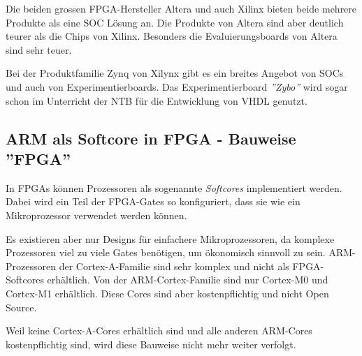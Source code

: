 Die beiden grossen FPGA-Hersteller Altera und auch Xilinx bieten beide mehrere Produkte als eine SOC Lösung an.
Die Produkte von Altera sind aber deutlich teurer als die Chips von Xilinx.
Besonders die Evaluierungsboards von Altera sind sehr teuer.

Bei der Produktfamilie Zynq von Xilynx gibt es ein breites Angebot von SOCs und auch von Experimentierboards.
Das Experimentierboard \textit{''Zybo''} wird sogar schon im Unterricht der NTB für die Entwicklung von VHDL genutzt.



\subsection{ARM als Softcore in FPGA - Bauweise ''FPGA''}
In FPGAs können Prozessoren als sogenannte \textit{Softcores} implementiert werden.
Dabei wird ein Teil der FPGA-Gates so konfiguriert, dass sie wie ein Mikroprozessor verwendet werden können.

Es existieren aber nur Designs für einfachere Mikroprozessoren, da komplexe Prozessoren viel zu viele Gates benötigen, um ökonomisch sinnvoll zu sein.
ARM-Prozessoren der Cortex-A-Familie sind sehr komplex und nicht als FPGA-Softcores erhältlich.
Von der ARM-Cortex-Familie sind nur Cortex-M0 und Cortex-M1 erhältlich.
Diese Cores sind aber kostenpflichtig und nicht Open Source.

Weil keine Cortex-A-Cores erhältlich sind und alle anderen ARM-Cores kostenpflichtig sind, wird diese Bauweise nicht mehr weiter verfolgt.


